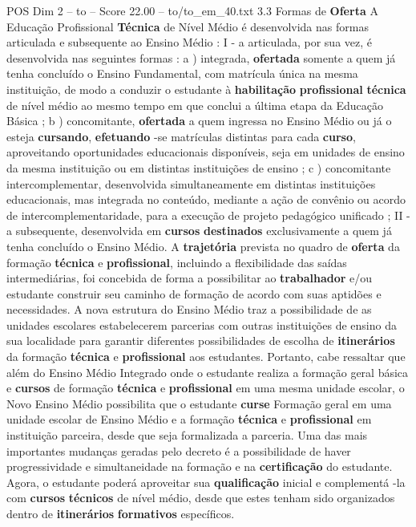 \begin{textsample}{POS Dim 2 – to – Score 22.00 – to/to\_em\_40.txt}  \label{ex:f2_pos_139}
3.3 Formas de \textbf{Oferta} A Educação Profissional \textbf{Técnica} de Nível Médio é desenvolvida nas formas articulada e subsequente ao Ensino Médio : I - a articulada, por sua vez, é desenvolvida nas seguintes formas : a ) integrada, \textbf{ofertada} somente a quem já tenha concluído o Ensino Fundamental, com matrícula única na mesma instituição, de modo a conduzir o estudante à \textbf{habilitação} \textbf{profissional} \textbf{técnica} de nível médio ao mesmo tempo em que conclui a última etapa da Educação Básica ; b ) concomitante, \textbf{ofertada} a quem ingressa no Ensino Médio ou já o esteja \textbf{cursando}, \textbf{efetuando} -se matrículas distintas para cada \textbf{curso}, aproveitando oportunidades educacionais disponíveis, seja em unidades de ensino da mesma instituição ou em distintas instituições de ensino ; c ) concomitante intercomplementar, desenvolvida simultaneamente em distintas instituições educacionais, mas integrada no conteúdo, mediante a ação de convênio ou acordo de intercomplementaridade, para a execução de projeto pedagógico unificado ; II - a subsequente, desenvolvida em \textbf{cursos} \textbf{destinados} exclusivamente a quem já tenha concluído o Ensino Médio.
A \textbf{trajetória} prevista no quadro de \textbf{oferta} da formação \textbf{técnica} e \textbf{profissional}, incluindo a flexibilidade das saídas intermediárias, foi concebida de forma a possibilitar ao \textbf{trabalhador} e/ou estudante construir seu caminho de formação de acordo com suas aptidões e necessidades.
A nova estrutura do Ensino Médio traz a possibilidade de as unidades escolares estabelecerem parcerias com outras instituições de ensino da sua localidade para garantir diferentes possibilidades de escolha de \textbf{itinerários} da formação \textbf{técnica} e \textbf{profissional} aos estudantes.
Portanto, cabe ressaltar que além do Ensino Médio Integrado onde o estudante realiza a formação geral básica e \textbf{cursos} de formação \textbf{técnica} e \textbf{profissional} em uma mesma unidade escolar, o Novo Ensino Médio possibilita que o estudante \textbf{curse} Formação geral em uma unidade escolar de Ensino Médio e a formação \textbf{técnica} e \textbf{profissional} em instituição parceira, desde que seja formalizada a parceria.
Uma das mais importantes mudanças geradas pelo decreto é a possibilidade de haver progressividade e simultaneidade na formação e na \textbf{certificação} do estudante.
Agora, o estudante poderá aproveitar sua \textbf{qualificação} inicial e complementá -la com \textbf{cursos} \textbf{técnicos} de nível médio, desde que estes tenham sido organizados dentro de \textbf{itinerários} \textbf{formativos} específicos.

\end{textsample}
